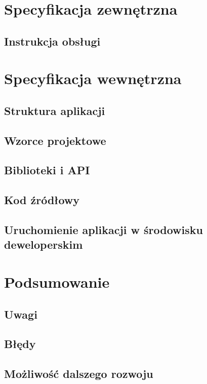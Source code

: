 \documentclass[a4paper,11pt,titlepage]{article}
\begin{document}
\section{Specyfikacja zewnętrzna}
\subsection{Instrukcja obsługi}


\section{Specyfikacja wewnętrzna}
\subsection{Struktura aplikacji}


\subsection{Wzorce projektowe}


\subsection{Biblioteki i API}

\subsection{Kod źródłowy}

\subsection{Uruchomienie aplikacji w środowisku deweloperskim}



\section{Podsumowanie}
\subsection{Uwagi}


\subsection{Błędy}


\subsection{Możliwość dalszego rozwoju}
\end{document}
